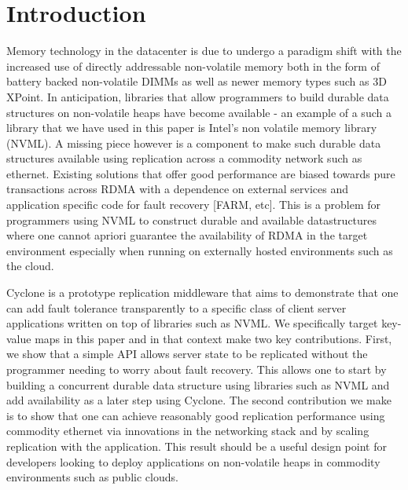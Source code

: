\documentclass[letterpaper,twocolumn,10pt]{article}
\begin{document}
\section{Introduction}
Memory technology in the datacenter is due to undergo a paradigm shift with the
increased use of directly addressable non-volatile memory both in the form of
battery backed non-volatile DIMMs as well as newer memory types such as 3D
XPoint. In anticipation, libraries that allow programmers to build durable data
structures on non-volatile heaps have become available - an example of a such a
library that we have used in this paper is Intel's non volatile memory library
(NVML). A missing piece however is a component to make such durable data
structures available using replication across a commodity network such as
ethernet. Existing solutions that offer good performance are biased towards pure
transactions across RDMA with a dependence on external services and application
specific code for fault recovery [FARM, etc]. This is a problem for programmers
using NVML to construct durable and available datastructures where one cannot
apriori guarantee the availability of RDMA in the target environment especially
when running on externally hosted environments such as the cloud.

Cyclone is a prototype replication middleware that aims to demonstrate that one
can add fault tolerance transparently to a specific class of client server
applications written on top of libraries such as NVML. We specifically target
key-value maps in this paper and in that context make two key
contributions. First, we show that a simple API allows server state to be
replicated without the programmer needing to worry about fault recovery. This
allows one to start by building a concurrent durable data structure using
libraries such as NVML and add availability as a later step using Cyclone. The
second contribution we make is to show that one can achieve reasonably good
replication performance using commodity ethernet via innovations in the
networking stack and by scaling replication with the application. This result
should be a useful design point for developers looking to deploy applications on
non-volatile heaps in commodity environments such as public clouds.
\end{document}
